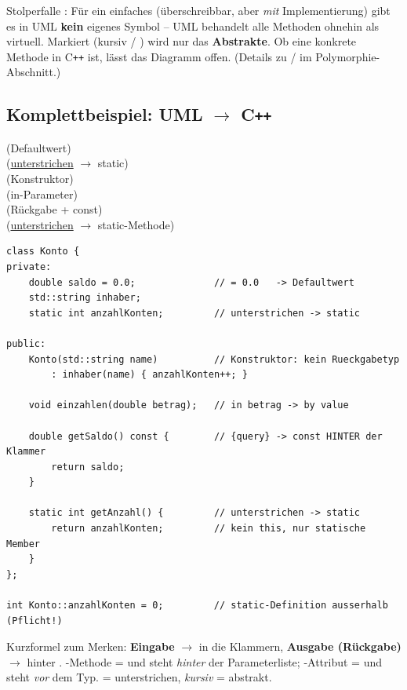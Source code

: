 \begin{merke}
Stolperfalle : F\"ur ein einfaches  (\"uberschreibbar, aber \emph{mit} Implementierung) gibt es in UML \textbf{kein} eigenes Symbol -- UML behandelt alle Methoden ohnehin als virtuell. Markiert (kursiv / ) wird nur das \textbf{Abstrakte}. Ob eine konkrete Methode in C\texttt{++}  ist, l\"asst das Diagramm offen. (Details zu / im Polymorphie-Abschnitt.)
\end{merke}

\subsection{Komplettbeispiel: UML $\rightarrow$ C\texttt{++}}
\begin{syntaxbox}
 \quad (Defaultwert) \\
 \quad (\underline{unterstrichen} $\rightarrow$ static) \\
 \quad (Konstruktor) \\
 \quad (in-Parameter) \\
 \quad (R\"uckgabe + const) \\
 \quad (\underline{unterstrichen} $\rightarrow$ static-Methode)
\end{syntaxbox}
\begin{lstlisting}
class Konto {
private:
    double saldo = 0.0;              // = 0.0   -> Defaultwert
    std::string inhaber;
    static int anzahlKonten;         // unterstrichen -> static

public:
    Konto(std::string name)          // Konstruktor: kein Rueckgabetyp
        : inhaber(name) { anzahlKonten++; }

    void einzahlen(double betrag);   // in betrag -> by value

    double getSaldo() const {        // {query} -> const HINTER der Klammer
        return saldo;
    }

    static int getAnzahl() {         // unterstrichen -> static
        return anzahlKonten;         // kein this, nur statische Member
    }
};

int Konto::anzahlKonten = 0;         // static-Definition ausserhalb (Pflicht!)
\end{lstlisting}
\begin{merke}
Kurzformel zum Merken: \textbf{Eingabe} $\rightarrow$ in die Klammern, \textbf{Ausgabe (R\"uckgabe)} $\rightarrow$ hinter \code{) :}. -Methode =  und steht \emph{hinter} der Parameterliste; -Attribut =  und steht \emph{vor} dem Typ.  = unterstrichen, \emph{kursiv} = abstrakt.
\end{merke}
\clearpage

